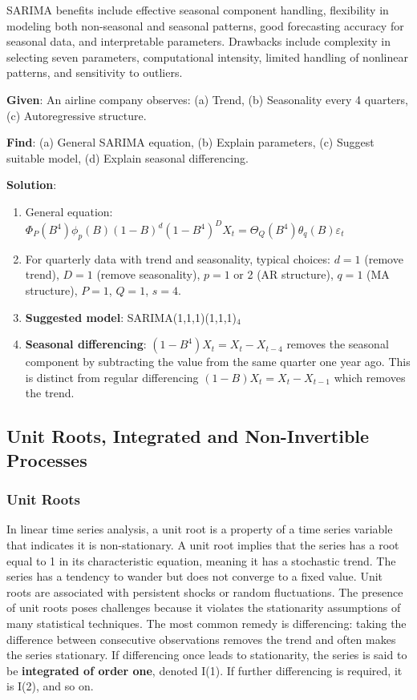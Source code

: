 \documentclass[11pt,a4paper]{article}
\begin{document}
SARIMA benefits include effective seasonal component handling, flexibility in modeling both non-seasonal and seasonal patterns, good forecasting accuracy for seasonal data, and interpretable parameters. Drawbacks include complexity in selecting seven parameters, computational intensity, limited handling of nonlinear patterns, and sensitivity to outliers.

\begin{tcolorbox}[colback=blue!5!white,colframe=blue!75!black,title=\textbf{Worked Example 9: SARIMA Model for Airline Data}]
\textbf{Given}: An airline company observes: (a) Trend, (b) Seasonality every 4 quarters, (c) Autoregressive structure.

\textbf{Find}: (a) General SARIMA equation, (b) Explain parameters, (c) Suggest suitable model, (d) Explain seasonal differencing.

\textbf{Solution}:
\begin{enumerate}
    \item General equation: $\Phi_P(B^4)\phi_p(B)(1-B)^d(1-B^4)^D X_t = \Theta_Q(B^4)\theta_q(B)\varepsilon_t$
    \item For quarterly data with trend and seasonality, typical choices: $d=1$ (remove trend), $D=1$ (remove seasonality), $p=1$ or 2 (AR structure), $q=1$ (MA structure), $P=1$, $Q=1$, $s=4$.
    \item \textbf{Suggested model}: SARIMA(1,1,1)(1,1,1)$_4$
    \item \textbf{Seasonal differencing}: $(1-B^4)X_t = X_t - X_{t-4}$ removes the seasonal component by subtracting the value from the same quarter one year ago. This is distinct from regular differencing $(1-B)X_t = X_t - X_{t-1}$ which removes the trend.
\end{enumerate}
\end{tcolorbox}

\subsection{Unit Roots, Integrated and Non-Invertible Processes}

\subsubsection{Unit Roots}

In linear time series analysis, a unit root is a property of a time series variable that indicates it is non-stationary. A unit root implies that the series has a root equal to 1 in its characteristic equation, meaning it has a stochastic trend. The series has a tendency to wander but does not converge to a fixed value. Unit roots are associated with persistent shocks or random fluctuations. The presence of unit roots poses challenges because it violates the stationarity assumptions of many statistical techniques. The most common remedy is differencing: taking the difference between consecutive observations removes the trend and often makes the series stationary. If differencing once leads to stationarity, the series is said to be \textbf{integrated of order one}, denoted I(1). If further differencing is required, it is I(2), and so on.
\end{document}
